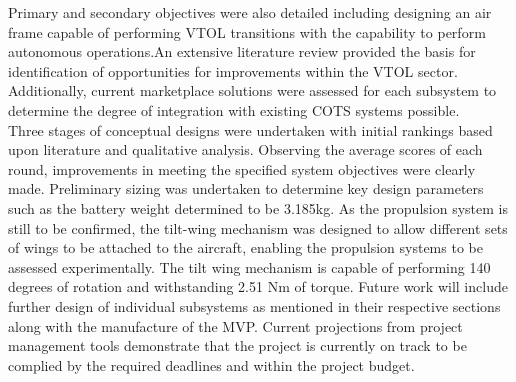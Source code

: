 Primary and secondary objectives were also detailed including designing an air frame capable of performing VTOL transitions with the capability to perform autonomous operations.An extensive literature review provided the basis for identification of opportunities for improvements within the VTOL sector. Additionally, current marketplace solutions were assessed for each subsystem to determine the degree of integration with existing COTS systems possible.  \\

Three stages of conceptual designs were undertaken with initial rankings based upon literature and qualitative analysis. Observing the average scores of each round, improvements in meeting the specified system objectives were clearly made. Preliminary sizing was undertaken to determine key design parameters such as the battery weight determined to be 3.185kg. As the propulsion system is still to be confirmed, the tilt-wing mechanism was designed to allow different sets of wings to be attached to the aircraft, enabling the propulsion systems to be assessed experimentally. The tilt wing mechanism is capable of performing 140 degrees of rotation and withstanding 2.51 Nm of torque. Future work will include further design of individual subsystems as mentioned in their respective sections along with the manufacture of the MVP. Current projections from project management tools demonstrate that the project is currently on track to be complied by the required deadlines and within the project budget. 

\clearpage
\begin{flushleft}

\end{flushleft}

\newpage

